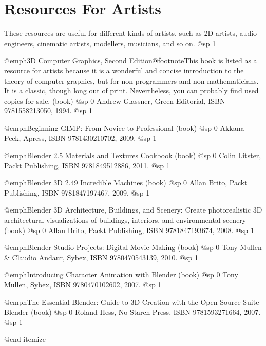\section{Resources For Artists}
These resources are useful for different kinds of artists, such as 2D artists, audio engineers, cinematic artists, modellers, musicians, and so on.
@sp 1
\itemize

\item
@emph{3D Computer Graphics, Second Edition}@footnote{This book is listed as a resource for artists because it is a wonderful and concise introduction to the theory of computer graphics, but for non-programmers and non-mathematicians. It is a classic, though long out of print. Nevertheless, you can probably find used copies for sale.} (book)
@sp 0
Andrew Glassner, Green Editorial, ISBN 9781558213050, 1994.
@sp 1

\item
@emph{Beginning GIMP: From Novice to Professional} (book)
@sp 0
Akkana Peck, Apress, ISBN 9781430210702, 2009.
@sp 1

\item
@emph{Blender 2.5 Materials and Textures Cookbook} (book)
@sp 0
Colin Litster, Packt Publishing, ISBN 9781849512886, 2011.
@sp 1

\item
@emph{Blender 3D 2.49 Incredible Machines} (book)
@sp 0
Allan Brito, Packt Publishing, ISBN 9781847197467, 2009.
@sp 1

\item
@emph{Blender 3D Architecture, Buildings, and Scenery: Create photorealistic 3D architectural visualizations of buildings, interiors, and environmental scenery} (book)
@sp 0
Allan Brito, Packt Publishing, ISBN 9781847193674, 2008.
@sp 1

\item
@emph{Blender Studio Projects: Digital Movie-Making} (book)
@sp 0
Tony Mullen & Claudio Andaur, Sybex, ISBN 9780470543139, 2010.
@sp 1

\item
@emph{Introducing Character Animation with Blender} (book)
@sp 0
Tony Mullen, Sybex, ISBN 9780470102602, 2007.
@sp 1

\item
@emph{The Essential Blender: Guide to 3D Creation with the Open Source Suite Blender} (book)
@sp 0
Roland Hess, No Starch Press, ISBN 9781593271664, 2007.
@sp 1

@end itemize

